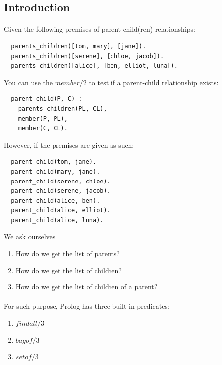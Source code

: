 \documentclass{article}
\begin{document}
\begin{multicols}{2}
  \subsection{Introduction}
  
  \paragraph{} Given the following premises of parent-child(ren) relationships:
  
  \begin{lstlisting}
  parents_children([tom, mary], [jane]).
  parents_children([serene], [chloe, jacob]).
  parents_children([alice], [ben, elliot, luna]).
  \end{lstlisting}  
  
  You can use the $member/2$ to test if a parent-child relationship exists:
  
  \begin{lstlisting}
  parent_child(P, C) :-
  	parents_children(PL, CL),
  	member(P, PL),
  	member(C, CL).
  \end{lstlisting}
  
  \noindent However, if the premises are given as such:
  
  \begin{lstlisting}
  parent_child(tom, jane).
  parent_child(mary, jane).
  parent_child(serene, chloe).
  parent_child(serene, jacob).
  parent_child(alice, ben).
  parent_child(alice, elliot).
  parent_child(alice, luna).
  \end{lstlisting}  
  
  \noindent We ask ourselves:
  
  \begin{enumerate}[\hspace{0.6cm}]
  \item How do we get the list of parents?
  \item How do we get the list of children?
  \item How do we get the list of children of a parent?
  \end{enumerate}
  
  \paragraph{} For such purpose, Prolog has three built-in predicates:
  
  \begin{enumerate}[\hspace{0.6cm}-]
  \item $findall/3$
  \item $bagof/3$
  \item $setof/3$
  \end{enumerate}
  

\end{multicols}
\end{document}
